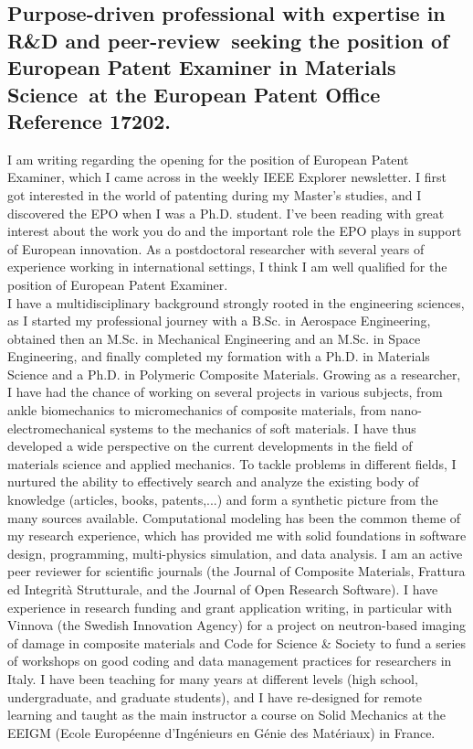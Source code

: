 \documentclass[
  a4paper, 
]{fortysecondscv}
\def\expertise{R\&D and peer-review}
\def\position{the position of European Patent Examiner in Materials Science}
\def\company{the European Patent Office}
\def\reference{\\[6pt] Reference 17202}
\def\salutation{MADAM/SIR}
\begin{document}
\makefrontsidebar

\cvsignature
\vspace*{12pt}
\subsection{\textbf{Purpose-driven professional with expertise in \expertise\ seeking \position\ at \company\reference.}}
\vspace*{12pt}
I am writing regarding the opening for the position of European Patent Examiner, which I came across in the weekly IEEE Explorer newsletter. I first got interested in the world of patenting during my Master's studies, and I discovered the EPO when I was a Ph.D. student. I've been reading with great interest about the work you do and the important role the EPO plays in support of European innovation. As a postdoctoral researcher with several years of experience working in international settings, I think I am well qualified for the position of European Patent Examiner.\\[6pt]
I have a multidisciplinary background strongly rooted in the engineering sciences, as I started my professional journey with a B.Sc. in Aerospace Engineering, obtained then an M.Sc. in Mechanical Engineering and an M.Sc. in Space Engineering, and finally completed my formation with a Ph.D. in Materials Science and a Ph.D. in Polymeric Composite Materials. Growing as a researcher, I have had the chance of working on several projects in various subjects, from ankle biomechanics to micromechanics of composite materials, from nano-electromechanical systems to the mechanics of soft materials. I have thus developed a wide perspective on the current developments in the field of materials science and applied mechanics. To tackle problems in different fields, I nurtured the ability to effectively search and analyze the existing body of knowledge (articles, books, patents,...) and form a synthetic picture from the many sources available. Computational modeling has been the common theme of my research experience, which has provided me with solid foundations in software design, programming, multi-physics simulation, and data analysis. I am an active peer reviewer for scientific journals (the Journal of Composite Materials, Frattura ed Integrit{\`a} Strutturale, and the Journal of Open Research Software). I have experience in research funding and grant application writing, in particular with Vinnova (the Swedish Innovation Agency) for a project on neutron-based imaging of damage in composite materials and Code for Science \& Society to fund a series of workshops on good coding and data management practices for researchers in Italy. I have been teaching for many years at different levels (high school, undergraduate, and graduate students), and I have re-designed for remote learning and taught as the main instructor a course on Solid Mechanics at the EEIGM (Ecole Europ{\'e}enne d’Ing{\'e}nieurs en G{\'e}nie des Mat{\'e}riaux) in France.\\[6pt]
\end{document}
